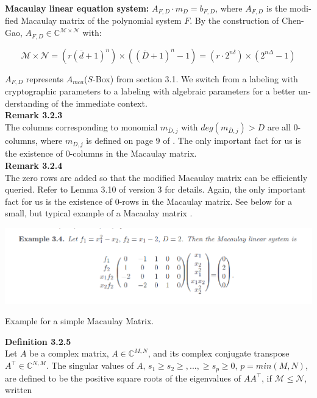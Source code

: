 \documentclass[a4paper,11pt]{article}
\begin{document}
\begin{otherlanguage}{english}
\noindent
\textbf{Macaulay linear equation system:} $A_{F,D} \cdot m_D = b_{F,D}$,
where $A_{F,D}$ is the modified Macaulay matrix of the polynomial system $F$. By the construction of Chen-Gao, $A_{F,D} \in \mathbb{C}^{\mathcal{M} \times \mathcal{N}}$ with:

$$\mathcal{M} \times \mathcal{N} = ( r (\overline{d}+1)^n ) \times ((\overline{D} + 1 )^n -1) 
= (r \cdot 2^{n \delta}) \times (2^{n \Delta} -1 )$$

\noindent
$A_{F,D}$ represents $A_{mca}$($S$-Box) from section 3.1. We switch from a labeling with cryptographic parameters to a labeling with algebraic parameters for a better understanding of the immediate context.\\

\noindent
\textbf{Remark 3.2.3} \\
The columns corresponding to monomial $m_{\overline{D},j}$ with $deg(m_{\overline{D},j}) > D$ are all $0$-columns, where $m_{\overline{D},j}$ is defined on page $9$ of \cite{QAA}. The only important fact for us is the existence of $0$-columns in the Macaulay matrix. \\

\noindent
\textbf{Remark 3.2.4} \\
The zero rows are added so that the modified Macaulay matrix can be efficiently queried. Refer to Lemma 3.10 of \cite{QAA} version 3 for details. Again, the only important fact for us is the existence of $0$-rows in the Macaulay matrix. 
See below for a small, but typical example of a Macaulay matrix \cite{BDM}. \\

\begin{figurehere}
  \centering
  \includegraphics[width=14cm]{Macaulay.png}
  \caption{Example for a simple Macaulay Matrix.\label{abb_1}}
\end{figurehere}
\vspace{0.3cm}

\noindent
\textbf{Definition 3.2.5} \\
Let $A$ be a complex matrix, $A \in \mathbb{C}^{M,N}$, and its complex conjugate transpose $A^\intercal \in \mathbb{C}^{N,M}$. The singular values of $A, \, s_1 \geq s_2 \geq,...,\geq s_p \geq 0, \, p = min(M,N)$, are defined to be the positive square roots of the eigenvalues of $AA^\intercal$, if $\mathcal{M} \leq \mathcal{N}$, written


\end{otherlanguage}
\end{document}
